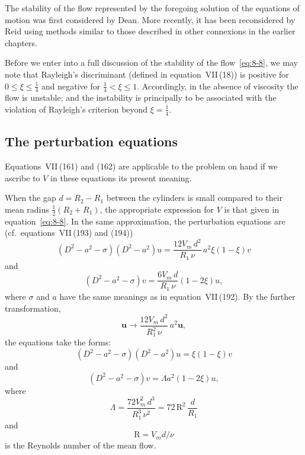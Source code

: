 The stability of the flow represented by the foregoing solution of the equations of motion was first considered by Dean. More recently, it has been reconsidered by Reid using methods similar to those described in other connexions in the earlier chapters.

Before we enter into a full discussion of the stability of the flow~\eqref{eq:8-8}, we may note that Rayleigh's discriminant (defined in equation~VII\,(18)) is positive for $0 \leqslant \xi \leqslant \tfrac{1}{4}$ and negative for $\tfrac{1}{4} < \xi \leqslant 1$. Accordingly, in the absence of viscosity the flow is unstable; and the instability is principally to be associated with the violation of Rayleigh's criterion beyond $\xi = \tfrac{1}{4}$.

\subsection{The perturbation equations}
\label{sec:76a}

Equations~VII\,(161) and (162) are applicable to the problem on hand if we ascribe to $V$ in these equations its present meaning.

When the gap $d = R_2 - R_1$ between the cylinders is small compared to their mean radius $\tfrac{1}{2}(R_2 + R_1)$, the appropriate expression for $V$ is that given in equation~\eqref{eq:8-8}. In the same approximation, the perturbation equations are (cf.\ equations~VII\,(193) and (194))
\begin{equation}
\label{eq:8-10}
(D^2 - a^2 - \sigma)(D^2 - a^2)u = \frac{12V_m\,d^2}{R_1\,\nu}\,a^2\xi(1-\xi)v
\end{equation}
and
\begin{equation}
\label{eq:8-11}
(D^2 - a^2 - \sigma)v = \frac{6V_m\,d}{R_1\,\nu}(1-2\xi)u,
\end{equation}
where $\sigma$ and $a$ have the same meanings as in equation~VII\,(192). By the further transformation,
\begin{equation}
\label{eq:8-12}
\mathbf{u} \to \frac{12V_m\,d^2}{R_1^2\,\nu}\,a^2\mathbf{u},
\end{equation}
the equations take the forms:
\begin{equation}
\label{eq:8-13}
(D^2 - a^2 - \sigma)(D^2 - a^2)u = \xi(1-\xi)v
\end{equation}
and
\begin{equation}
\label{eq:8-14}
(D^2 - a^2 - \sigma)v = \Lambda a^2(1-2\xi)u,
\end{equation}
where
\begin{equation}
\label{eq:8-15}
\Lambda = \frac{72 V_m^2\,d^3}{R_1^3\,\nu^2} = 72\,\mathrm{R}^2\,\frac{d}{R_1}
\end{equation}
and
\begin{equation}
\label{eq:8-16}
\mathrm{R} = V_m d/\nu
\end{equation}
is the Reynolds number of the mean flow.


